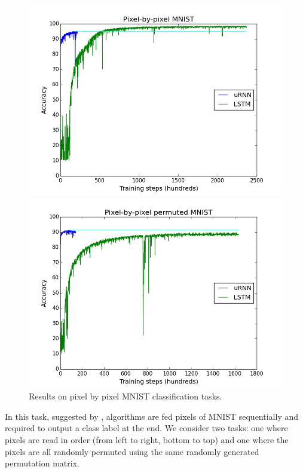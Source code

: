 \documentclass{article} %
\begin{document}
\begin{figure}[t!] 
  \label{fig3} 
  \begin{minipage}[b]{0.5\linewidth}
    \centering
    \includegraphics[scale=0.25]{figures/mnist.jpeg}
  \end{minipage}%
  \begin{minipage}[b]{0.5\linewidth}
    \centering
    \includegraphics[scale=0.25]{figures/mnist_perm.jpeg}
  \end{minipage}
  \caption{Results on pixel by pixel MNIST classification tasks.}
\end{figure}


In this task, suggested by \cite{Quoc2015}, algorithms are fed pixels of MNIST \citep{MNIST} sequentially and required to output a 
class label at the end. We consider two tasks: one where pixels are read in order (from left to right,
bottom to top) and one where the pixels are all randomly permuted using the same randomly generated
permutation matrix.
\end{document}
